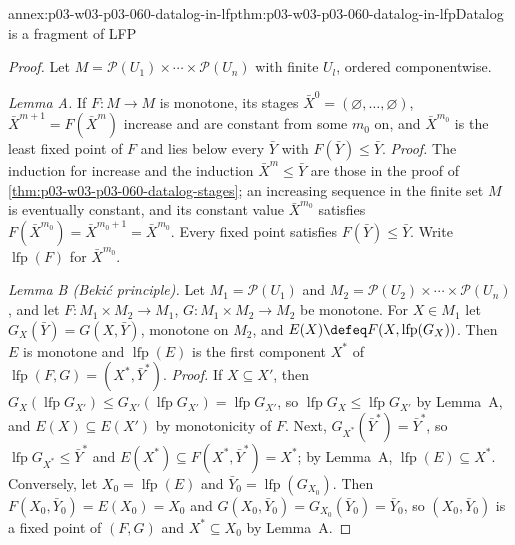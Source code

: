 \begin{annexitem}{annex:p03-w03-p03-060-datalog-in-lfp}{thm:p03-w03-p03-060-datalog-in-lfp}{Datalog is a fragment of LFP}
\begin{proof}
Let \(M=\mathcal P(U_1)\times\cdots\times\mathcal P(U_n)\) with finite
\(U_l\), ordered componentwise.

\emph{Lemma A.} If \(F\colon M\to M\) is monotone, its stages
\(\bar X^0=(\varnothing,\ldots,\varnothing)\),
\(\bar X^{m+1}=F(\bar X^m)\) increase and are constant from some \(m_0\)
on, and \(\bar X^{m_0}\) is the least fixed point of \(F\) and lies below
every \(\bar Y\) with \(F(\bar Y)\le\bar Y\). \emph{Proof.} The induction
for increase and the induction \(\bar X^m\le\bar Y\) are those in the proof
of \cref{thm:p03-w03-p03-060-datalog-stages}; an increasing sequence in the
finite set \(M\) is eventually constant, and its constant value
\(\bar X^{m_0}\) satisfies \(F(\bar X^{m_0})=\bar X^{m_0+1}=\bar X^{m_0}\).
Every fixed point satisfies \(F(\bar Y)\le\bar Y\). Write
\(\operatorname{lfp}(F)\) for \(\bar X^{m_0}\).

\emph{Lemma B (Beki\'c principle).} Let \(M_1=\mathcal P(U_1)\) and
\(M_2=\mathcal P(U_2)\times\cdots\times\mathcal P(U_n)\), and let
\(F\colon M_1\times M_2\to M_1\), \(G\colon M_1\times M_2\to M_2\) be
monotone. For \(X\in M_1\) let \(G_X(\bar Y)=G(X,\bar Y)\), monotone on
\(M_2\), and \(E(X)\defeq F(X,\operatorname{lfp}(G_X))\). Then \(E\) is
monotone and \(\operatorname{lfp}(E)\) is the first component \(X^\ast\)
of \(\operatorname{lfp}(F,G)=(X^\ast,\bar Y^\ast)\). \emph{Proof.} If
\(X\subseteq X'\), then
\(G_X(\operatorname{lfp}G_{X'})\le G_{X'}(\operatorname{lfp}G_{X'})=\operatorname{lfp}G_{X'}\),
so \(\operatorname{lfp}G_X\le\operatorname{lfp}G_{X'}\) by Lemma~A, and
\(E(X)\subseteq E(X')\) by monotonicity of \(F\). Next,
\(G_{X^\ast}(\bar Y^\ast)=\bar Y^\ast\), so
\(\operatorname{lfp}G_{X^\ast}\le\bar Y^\ast\) and
\(E(X^\ast)\subseteq F(X^\ast,\bar Y^\ast)=X^\ast\); by Lemma~A,
\(\operatorname{lfp}(E)\subseteq X^\ast\). Conversely, let
\(X_0=\operatorname{lfp}(E)\) and \(\bar Y_0=\operatorname{lfp}(G_{X_0})\).
Then \(F(X_0,\bar Y_0)=E(X_0)=X_0\) and
\(G(X_0,\bar Y_0)=G_{X_0}(\bar Y_0)=\bar Y_0\), so \((X_0,\bar Y_0)\) is a
fixed point of \((F,G)\) and \(X^\ast\subseteq X_0\) by Lemma~A.


\end{proof}
\end{annexitem}

